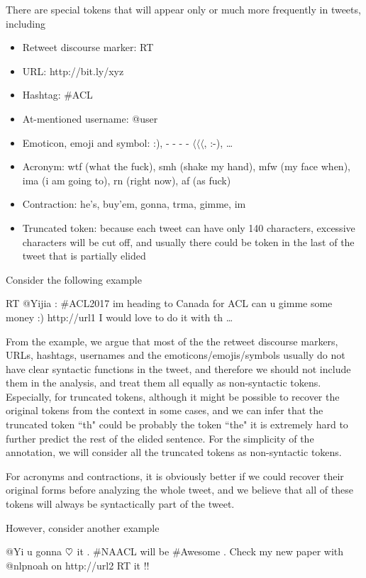 \documentclass[11pt,letterpaper]{article}
\newcommand{\heart}{\ensuremath\heartsuit}
\begin{document}
There are special tokens that will appear only or much more frequently in tweets, including
	
\begin{itemize}
\item Retweet discourse marker: RT
\item URL: http://bit.ly/xyz
\item Hashtag: \#ACL
\item At-mentioned username: @user
\item Emoticon, emoji and symbol: :), - - - - $\langle$$\langle$$\langle$, :-), …
\item Acronym: wtf (what the fuck), smh (shake my hand), mfw (my face when), ima (i am going to), rn (right now), af (as fuck)
\item Contraction: he's, buy'em, gonna, trma, gimme, im
\item Truncated token: because each tweet can have only 140 characters, excessive characters will be cut off, and usually there could be token in the last of the tweet that is partially elided
\end{itemize}

Consider the following example

\begin{center}
RT @Yijia : \#ACL2017 im heading to Canada for ACL can u gimme some money :) http://url1 I would love to do it with th …
\end{center}

From the example, we argue that most of the the retweet discourse markers, URLs, hashtags, usernames and the emoticons/emojis/symbols usually do not have clear syntactic functions in the tweet, and therefore we should not include them in the analysis, and treat them all equally as non-syntactic tokens. Especially, for truncated tokens, although it might be possible to recover the original tokens from the context in some cases, and we can infer that the truncated token ``th" could be probably the token ``the" it is extremely hard to further predict the rest of the elided sentence. For the simplicity of the annotation, we will consider all the truncated tokens as non-syntactic tokens.  

For acronyms and contractions, it is obviously better if we could recover their original forms before analyzing the whole tweet, and we believe that all of these tokens will always be syntactically part of the tweet.

However, consider another example

\begin{center}
@Yi u gonna $\heart$ it . \#NAACL will be \#Awesome . Check my new paper with @nlpnoah on http://url2 RT it !!
\end{center}
\end{document}
